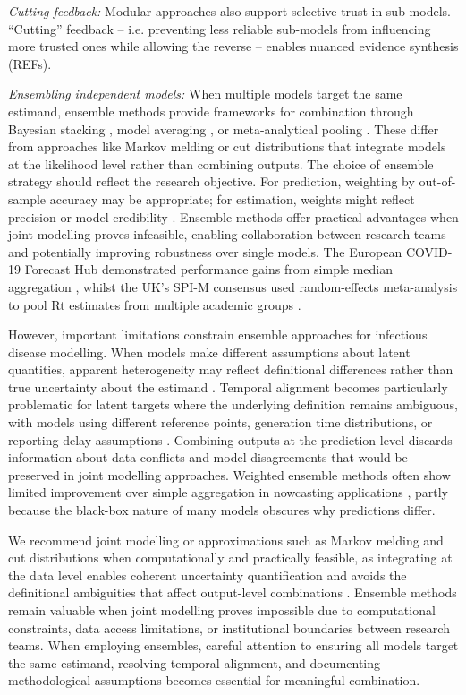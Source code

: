 \documentclass{article}
\begin{document}
\textit{Cutting feedback:} Modular approaches also support selective trust in sub-models. ``Cutting'' feedback -- i.e. preventing less reliable sub-models from influencing more trusted ones while allowing the reverse -- enables nuanced evidence synthesis (REFs).

\textit{Ensembling independent models:} When multiple models target the same estimand, ensemble methods provide frameworks for combination through Bayesian stacking \citep{yao2018using}, model averaging \citep{hoeting1999bayesian}, or meta-analytical pooling \citep{jackson2011multivariate}.
These differ from approaches like Markov melding or cut distributions that integrate models at the likelihood level rather than combining outputs.
The choice of ensemble strategy should reflect the research objective.
For prediction, weighting by out-of-sample accuracy may be appropriate; for estimation, weights might reflect precision or model credibility \citep{yao2018using}.
Ensemble methods offer practical advantages when joint modelling proves infeasible, enabling collaboration between research teams and potentially improving robustness over single models.
The European COVID-19 Forecast Hub demonstrated performance gains from simple median aggregation \citep{sherratt2021exploring}, whilst the UK's SPI-M consensus used random-effects meta-analysis to pool Rt estimates from multiple academic groups \citep{manley2024combining}.

However, important limitations constrain ensemble approaches for infectious disease modelling.
When models make different assumptions about latent quantities, apparent heterogeneity may reflect definitional differences rather than true uncertainty about the estimand \citep{brockhaus2023why}.
Temporal alignment becomes particularly problematic for latent targets where the underlying definition remains ambiguous, with models using different reference points, generation time distributions, or reporting delay assumptions \citep{manley2024combining,brockhaus2023why}.
Combining outputs at the prediction level discards information about data conflicts and model disagreements that would be preserved in joint modelling approaches.
Weighted ensemble methods often show limited improvement over simple aggregation in nowcasting applications \citep{sherratt2021exploring}, partly because the black-box nature of many models obscures why predictions differ.

We recommend joint modelling or approximations such as Markov melding and cut distributions when computationally and practically feasible, as integrating at the data level enables coherent uncertainty quantification and avoids the definitional ambiguities that affect output-level combinations \citep{brockhaus2023why}.
Ensemble methods remain valuable when joint modelling proves impossible due to computational constraints, data access limitations, or institutional boundaries between research teams.
When employing ensembles, careful attention to ensuring all models target the same estimand, resolving temporal alignment, and documenting methodological assumptions becomes essential for meaningful combination.
\end{document}
